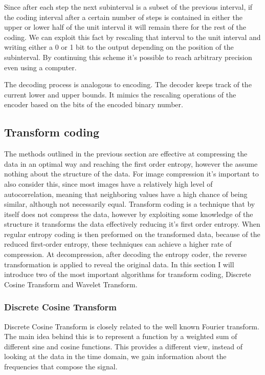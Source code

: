       Since after each step the next subinterval is a subset of the previous interval, if the coding interval after a certain number of steps is contained in either the upper or lower half of the unit interval it will remain there for the rest of the coding. We can exploit this fact by rescaling that interval to the unit interval and writing either a 0 or 1 bit to the output depending on the position of the subinterval. By continuing this scheme it's possible to reach arbitrary precision even using a computer.

      The decoding process is analogous to encoding. The decoder keeps track of the current lower and upper bounds. It mimics the rescaling operations of the encoder based on the bits of the encoded binary number.

  \subsection{Transform coding}
    The methods outlined in the previous section are effective at compressing the data in an optimal way and reaching the first order entropy, however the assume nothing about the structure of the data. For image compression it's important to also consider this, since most images have a relatively high level of autocorrelation, meaning that neighboring values have a high chance of being similar, although not necessarily equal. Transform coding is a technique that by itself does not compress the data, however by exploiting some knowledge of the structure it transforms the data effectively reducing it's first order entropy. When regular entropy coding is then preformed on the transformed data, because of the reduced first-order entropy, these techniques can achieve a higher rate of compression. At decompression, after decoding the entropy coder, the reverse transformation is applied to reveal the original data. In this section I will introduce two of the most important algorithms for transform coding, Discrete Cosine Transform and Wavelet Transform.

    \subsubsection{Discrete Cosine Transform}
      Discrete Cosine Transform \cite{ahmed_discrete_1974} is closely related to the well known Fourier transform. The main idea behind this is to represent a function by a weighted sum of different sine and cosine functions. This provides a different view, instead of looking at the data in the time domain, we gain information about the frequencies that compose the signal. 

